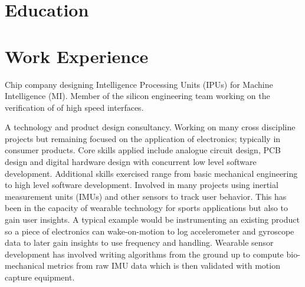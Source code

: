 \documentclass[11pt,a4paper,sans]{moderncv}
\begin{document}
\makecvtitle

\section{Education}


\section{Work Experience}
      { Chip company designing Intelligence Processing Units (IPUs) for Machine Intelligence (MI). 
        Member of the silicon engineering team working on the verification of of high speed interfaces.
        }
        {}

      {  A technology and product design consultancy. 
         Working on many cross discipline projects but remaining focused on the application of electronics; typically in consumer products.
         Core skills applied include analogue circuit design, PCB design and digital hardware design with concurrent low level software development. 
         Additional skills exercised range from basic mechanical engineering to high level software development.       
        Involved in many projects using inertial measurement units (IMUs) and other sensors to track user behavior. This has been in the capacity of wearable technology for sports applications but also to gain user insights. A typical example would be instrumenting an existing product so a piece of electronics can wake-on-motion to log accelerometer and gyroscope data to later gain insights to use frequency and handling. Wearable sensor development has involved writing algorithms from the ground up to compute bio-mechanical metrics from raw IMU data which is then validated with motion capture equipment.
      }
\end{document}
